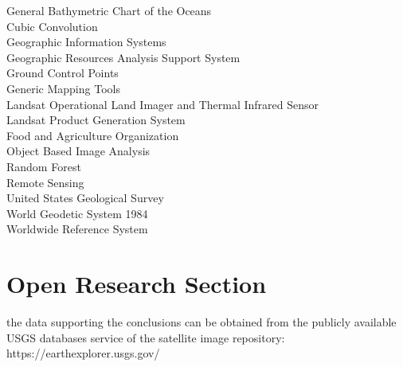 \documentclass[draft]{agujournal2019}
\begin{document}
 \begin{acronyms}
 General Bathymetric Chart of the Oceans\\
 Cubic Convolution \\
   Geographic Information Systems \\
    Geographic Resources Analysis Support System \\
    Ground Control Points \\
    Generic Mapping Tools \\
   Landsat Operational Land Imager and Thermal Infrared Sensor \\
   Landsat Product Generation System \\
   Food and Agriculture Organization \\
   Object Based Image Analysis \\
   Random Forest \\
Remote Sensing\\
    United States Geological Survey\\
    World Geodetic System 1984\\
    Worldwide Reference System \\
\end{acronyms}




%
%

\section*{Open Research Section}
the data supporting the conclusions can be obtained from the publicly available USGS databases service of the satellite image repository: https://earthexplorer.usgs.gov/
\end{document}
